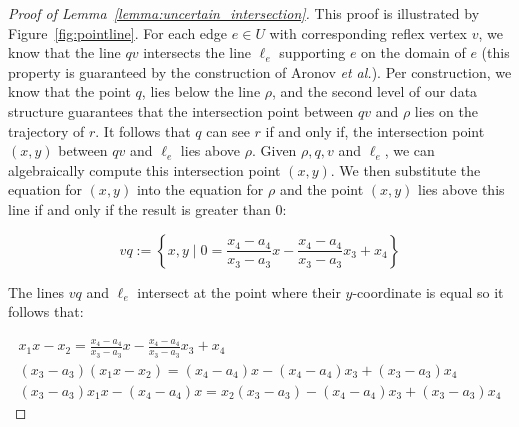 \documentclass[a4paper, UKenglish]{lipics-v2018}
\newcommand{\etal}{\textit{et al.}\xspace}
\begin{document}
\begin{proof}[Proof of Lemma~\ref{lemma:uncertain_intersection}]
This proof is illustrated by Figure~\ref{fig:pointline}.
For each edge $e \in U$ with corresponding reflex vertex $v$, we know that the line $qv$ intersects the line $\ell_e$ supporting $e$ on the domain of $e$ (this property is guaranteed by the construction of Aronov \etal). Per construction, we know that the point $q$, lies below the line $\rho$, and the second level of our data structure guarantees that the intersection point between $qv$ and $\rho$ lies on the trajectory of $r$. It follows that $q$ can see $r$ if and only if, the intersection point $(x,y)$ between $qv$ and $\ell_e$ lies above $\rho$. Given $\rho, q, v$ and $\ell_e$, we can algebraically compute this intersection point $(x,y)$. We then substitute the equation for $(x, y)$ into the equation for $\rho$ and the point $(x,y)$ lies above this line if and only if the result is greater than $0$:

\[
vq := \left\{x,y \mid 0 =  \frac{x_4 - a_4}{x_3 - a_3} x - \frac{x_4 - a_4}{x_3 - a_3}x_3 + x_4  \right\}
\]

The lines $vq$ and $\ell_e$ intersect at the point where their $y$-coordinate is equal so it follows that: 


\begin{align*}
    x_1 x - x_2 =  \frac{x_4 - a_4}{x_3 - a_3} x - \frac{x_4 - a_4}{x_3 - a_3}x_3 + x_4 \\
    (x_3 - a_3)(x_1 x - x_2) = (x_4 - a_4) x - (x_4 - a_4)x_3 + (x_3 - a_3) x_4 \\
    (x_3 - a_3)x_1 x - (x_4 - a_4) x = x_2 (x_3 - a_3) - (x_4 - a_4)x_3 + (x_3 - a_3) x_4 
\end{align*}


\end{proof}
\end{document}
